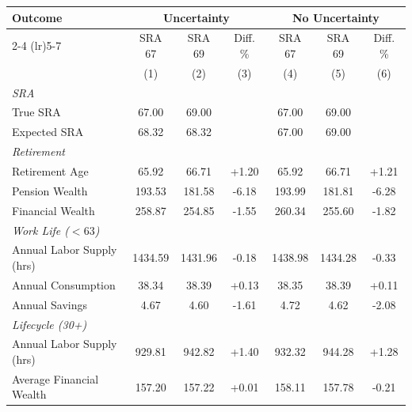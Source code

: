 \begin{tabular}{lcccccc}
    \toprule
    \multirow{2}{*}{Outcome} & \multicolumn{3}{c}{Uncertainty} & \multicolumn{3}{c}{No Uncertainty} \\
    \cmidrule(lr){2-4} \cmidrule(lr){5-7}
     & SRA 67 & SRA 69 & Diff. \% & SRA 67 & SRA 69 & Diff. \% \\
     & (1) & (2) & (3) & (4) & (5) & (6) \\
    \midrule
    \midrule
    \multicolumn{7}{l}{\textit{SRA}} \\
    True SRA & 67.00 & 69.00 &  & 67.00 & 69.00 &  \\
    Expected SRA & 68.32 & 68.32 &  & 67.00 & 69.00 &  \\
    \midrule
    \multicolumn{7}{l}{\textit{Retirement}} \\
    Retirement Age & 65.92 & 66.71 & +1.20 & 65.92 & 66.71 & +1.21 \\
    Pension Wealth & 193.53 & 181.58 & -6.18 & 193.99 & 181.81 & -6.28 \\
    Financial Wealth & 258.87 & 254.85 & -1.55 & 260.34 & 255.60 & -1.82 \\
    \midrule
    \multicolumn{7}{l}{\textit{Work Life ($<63$)}} \\
    Annual Labor Supply (hrs) & 1434.59 & 1431.96 & -0.18 & 1438.98 & 1434.28 & -0.33 \\
    Annual Consumption & 38.34 & 38.39 & +0.13 & 38.35 & 38.39 & +0.11 \\
    Annual Savings & 4.67 & 4.60 & -1.61 & 4.72 & 4.62 & -2.08 \\
    \midrule
    \multicolumn{7}{l}{\textit{Lifecycle (30+)}} \\
    Annual Labor Supply (hrs) & 929.81 & 942.82 & +1.40 & 932.32 & 944.28 & +1.28 \\
    Average Financial Wealth & 157.20 & 157.22 & +0.01 & 158.11 & 157.78 & -0.21 \\
    \bottomrule
\end{tabular}
